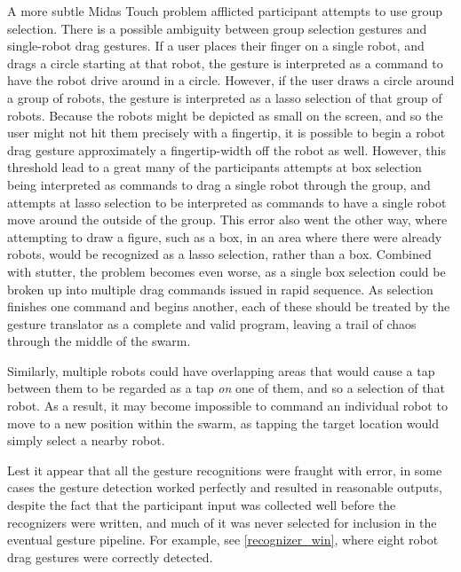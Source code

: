 A more subtle Midas Touch problem afflicted participant attempts to use group selection. 
There is a possible ambiguity between group selection gestures and single-robot drag gestures. 
If a user places their finger on a single robot, and drags a circle starting at that robot, the gesture is interpreted as a command to have the robot drive around in a circle.
However, if the user draws a circle around a group of robots, the gesture is interpreted as a lasso selection of that group of robots. 
Because the robots might be depicted as small on the screen, and so the user might not hit them precisely with a fingertip, it is possible to begin a robot drag gesture approximately a fingertip-width off the robot as well. 
However, this threshold lead to a great many of the participants attempts at box selection being interpreted as commands to drag a single robot through the group, and attempts at lasso selection to be interpreted as commands to have a single robot move around the outside of the group. 
This error also went the other way, where attempting to draw a figure, such as a box, in an area where there were already robots, would be recognized as a lasso selection, rather than a box.
Combined with stutter, the problem becomes even worse, as a single box selection could be broken up into multiple drag commands issued in rapid sequence. 
As selection finishes one command and begins another, each of these should be treated by the gesture translator as a complete and valid program, leaving a trail of chaos through the middle of the swarm. 

Similarly, multiple robots could have overlapping areas that would cause a tap between them to be regarded as a tap \emph{on} one of them, and so a selection of that robot.
As a result, it may become impossible to command an individual robot to move to a new position within the swarm, as tapping the target location would simply select a nearby robot. 

Lest it appear that all the gesture recognitions were fraught with error, in some cases the gesture detection worked perfectly and resulted in reasonable outputs, despite the fact that the participant input was collected well before the recognizers were written, and much of it was never selected for inclusion in the eventual gesture pipeline. 
For example, see \ref{recognizer_win}, where eight robot drag gestures were correctly detected.
 
